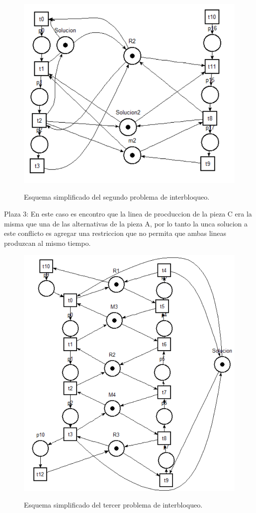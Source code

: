 \documentclass[10pt, a4paper,notitlepage]{article}
\begin{document}
\begin{figure}[H] %
	{\includegraphics[width=0.4\linewidth]{./figure/I21}}
	\caption{Esquema simplificado del segundo problema de interbloqueo.}
	\label{fig:I20}
\end{figure}

Plaza 3:
En este caso es encontro que la linea de procduccion de la pieza C era la misma que una de las alternativas de la pieza A, por lo tanto la unca solucion a este conflicto es agregar una restriccion que no permita que ambas lineas produzcan al mismo tiempo. 

\begin{figure}[H] %
	{\includegraphics[width=0.4\linewidth]{./figure/I31}}
	\caption{Esquema simplificado del tercer problema de interbloqueo.}
	\label{fig:I30}
\end{figure}
\end{document}
